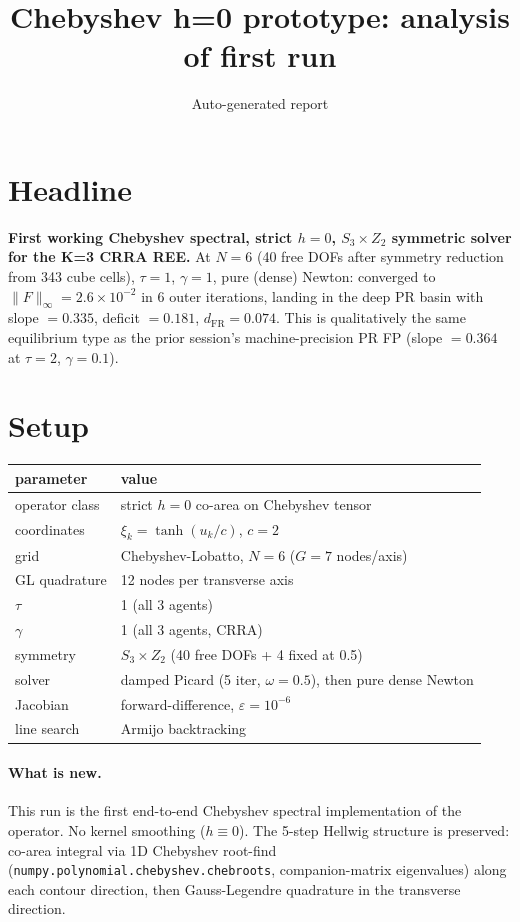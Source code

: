 \documentclass[11pt]{article}
\title{Chebyshev h=0 prototype: analysis of first run}
\author{Auto-generated report}
\date{}
\begin{document}
\maketitle

\section*{Headline}

\textbf{First working Chebyshev spectral, strict $h=0$, $S_3 \times Z_2$
symmetric solver for the K=3 CRRA REE.} At $N=6$ (40 free DOFs after symmetry
reduction from 343 cube cells), $\tau=1$, $\gamma=1$, pure (dense) Newton:
converged to $\|F\|_\infty = 2.6 \times 10^{-2}$ in 6 outer iterations,
landing in the deep PR basin with slope $= 0.335$, deficit $= 0.181$,
$d_\mathrm{FR} = 0.074$. This is qualitatively the same equilibrium type
as the prior session's machine-precision PR FP (slope $= 0.364$ at
$\tau=2$, $\gamma=0.1$).

\section{Setup}

\begin{center}\begin{tabular}{ll}\toprule
parameter & value \\\midrule
operator class & strict $h=0$ co-area on Chebyshev tensor \\
coordinates & $\xi_k = \tanh(u_k/c)$, $c=2$ \\
grid & Chebyshev-Lobatto, $N=6$ ($G=7$ nodes/axis) \\
GL quadrature & 12 nodes per transverse axis \\
$\tau$ & 1 (all 3 agents) \\
$\gamma$ & 1 (all 3 agents, CRRA) \\
symmetry & $S_3 \times Z_2$ (40 free DOFs + 4 fixed at 0.5) \\
solver & damped Picard (5 iter, $\omega=0.5$), then pure dense Newton \\
Jacobian & forward-difference, $\varepsilon = 10^{-6}$ \\
line search & Armijo backtracking \\
\bottomrule\end{tabular}\end{center}

\paragraph{What is new.} This run is the first end-to-end Chebyshev
spectral implementation of the operator. No kernel smoothing
($h \equiv 0$). The 5-step Hellwig structure is preserved: co-area integral
via 1D Chebyshev root-find (\texttt{numpy.polynomial.chebyshev.chebroots},
companion-matrix eigenvalues) along each contour direction, then
Gauss-Legendre quadrature in the transverse direction.
\end{document}
